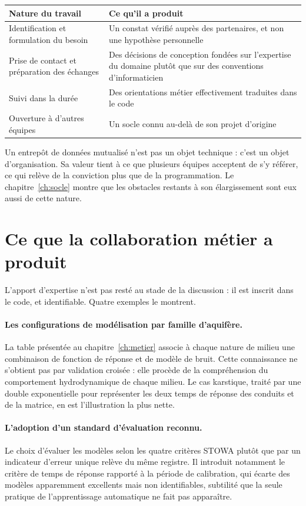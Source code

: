 \begin{center}
\begin{tabularx}{\textwidth}{@{}lX@{}}
\toprule
\textbf{Nature du travail} & \textbf{Ce qu'il a produit} \\
\midrule
Identification et formulation du besoin & Un constat vérifié auprès des partenaires, et non une
hypothèse personnelle \\
Prise de contact et préparation des échanges & Des décisions de conception fondées sur
l'expertise du domaine plutôt que sur des conventions d'informaticien \\
Suivi dans la durée & Des orientations métier effectivement traduites dans le code \\
Ouverture à d'autres équipes & Un socle connu au-delà de son projet d'origine \\
\bottomrule
\end{tabularx}
\end{center}

Un entrepôt de données mutualisé n'est pas un objet technique : c'est un objet d'organisation.
Sa valeur tient à ce que plusieurs équipes acceptent de s'y référer, ce qui relève de la
conviction plus que de la programmation. Le chapitre~\ref{ch:socle} montre que les obstacles
restants à son élargissement sont eux aussi de cette nature.

\section{Ce que la collaboration métier a produit}
\label{sec:apport-metier}

L'apport d'expertise n'est pas resté au stade de la discussion : il est inscrit dans le code, et
identifiable. Quatre exemples le montrent.

\paragraph{Les configurations de modélisation par famille d'aquifère.} La table présentée au
chapitre~\ref{ch:metier} associe à chaque nature de milieu une combinaison de fonction de
réponse et de modèle de bruit. Cette connaissance ne s'obtient pas par validation croisée : elle
procède de la compréhension du comportement hydrodynamique de chaque milieu. Le cas karstique,
traité par une double exponentielle pour représenter les deux temps de réponse des conduits et
de la matrice, en est l'illustration la plus nette.

\paragraph{L'adoption d'un standard d'évaluation reconnu.} Le choix d'évaluer les modèles selon
les quatre critères STOWA plutôt que par un indicateur d'erreur unique relève du même registre.
Il introduit notamment le critère de temps de réponse rapporté à la période de calibration, qui
écarte des modèles apparemment excellents mais non identifiables, subtilité que la seule
pratique de l'apprentissage automatique ne fait pas apparaître.

